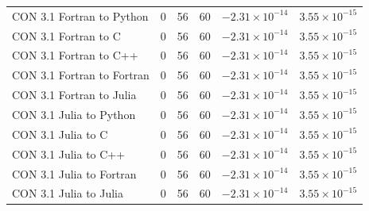 \begin{table}[ht]
{\begin{tabular}{@{}lccccc@{}}
CON 3.1 Fortran to Python & 0 & 56 & 60 & $-2.31\times10^{-14}$ & $3.55\times10^{-15}$ \\
CON 3.1 Fortran to C & 0 & 56 & 60 & $-2.31\times10^{-14}$ & $3.55\times10^{-15}$ \\
CON 3.1 Fortran to C++ & 0 & 56 & 60 & $-2.31\times10^{-14}$ & $3.55\times10^{-15}$ \\
CON 3.1 Fortran to Fortran & 0 & 56 & 60 & $-2.31\times10^{-14}$ & $3.55\times10^{-15}$ \\
CON 3.1 Fortran to Julia & 0 & 56 & 60 & $-2.31\times10^{-14}$ & $3.55\times10^{-15}$ \\
CON 3.1 Julia to Python & 0 & 56 & 60 & $-2.31\times10^{-14}$ & $3.55\times10^{-15}$ \\
CON 3.1 Julia to C & 0 & 56 & 60 & $-2.31\times10^{-14}$ & $3.55\times10^{-15}$ \\
CON 3.1 Julia to C++ & 0 & 56 & 60 & $-2.31\times10^{-14}$ & $3.55\times10^{-15}$ \\
CON 3.1 Julia to Fortran & 0 & 56 & 60 & $-2.31\times10^{-14}$ & $3.55\times10^{-15}$ \\
CON 3.1 Julia to Julia & 0 & 56 & 60 & $-2.31\times10^{-14}$ & $3.55\times10^{-15}$ \\
\bottomrule
\end{tabular}}
\end{table}
